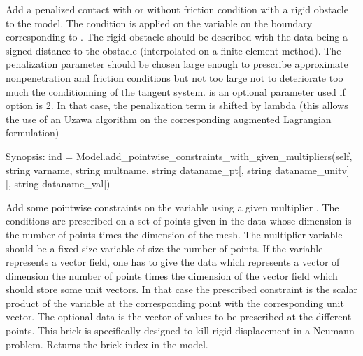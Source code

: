 \documentclass[a4paper,11pt,english]{sphinxmanual}
\begin{document}
\begin{fulllineitems}
\begin{fulllineitems}
Add a penalized contact with or without friction condition with a
rigid obstacle to the model.
The condition is applied on the variable 
on the boundary corresponding to . The rigid obstacle should
be described with the data  being a signed distance to
the obstacle (interpolated on a finite element method).
The penalization parameter  should be chosen
large enough to prescribe approximate non\sphinxhyphen{}penetration and friction
conditions but not too large not to deteriorate too much the
conditionning of the tangent system.
 is an optional parameter used if option
is 2. In that case, the penalization term is shifted by lambda (this
allows the use of an Uzawa algorithm on the corresponding augmented
Lagrangian formulation)

\end{fulllineitems}


\begin{fulllineitems}
\label{\detokenize{python/cmdref_Model:getfem.Model.add_pointwise_constraints_with_given_multipliers}}
Synopsis: ind = Model.add\_pointwise\_constraints\_with\_given\_multipliers(self, string varname, string multname, string dataname\_pt{[}, string dataname\_unitv{]} {[}, string dataname\_val{]})

Add some pointwise constraints on the variable  using a given
multiplier .
The conditions are prescribed on a set of points given in the data
 whose dimension is the number of points times the dimension
of the mesh.
The multiplier variable should be a fixed size variable of size the
number of points.
If the variable represents a vector field, one has to give the data
 which represents a vector of dimension the number of
points times the dimension of the vector field which should store some
unit vectors. In that case the prescribed constraint is the scalar
product of the variable at the corresponding point with the corresponding
unit vector.
The optional data  is the vector of values to be prescribed
at the different points.
This brick is specifically designed to kill rigid displacement
in a Neumann problem.
Returns the brick index in the model.


\end{fulllineitems}
\end{fulllineitems}
\end{document}

